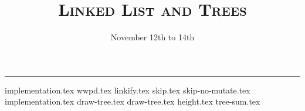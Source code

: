 \documentclass{exam}
\title{\textsc{Linked List and Trees}}
\date{November 12th to 14th}
\begin{document}
\maketitle
\rule{\textwidth}{0.15em}
\fontsize{12}{15}\selectfont


\begin{questions}
{implementation.tex}
{wwpd.tex}
\newpage
{linkify.tex}
{skip.tex}
{skip-no-mutate.tex}
\newpage
{implementation.tex}
{draw-tree.tex}
\newpage
{draw-tree.tex}
{height.tex}
{tree-sum.tex}


\end{questions}
\end{document}

